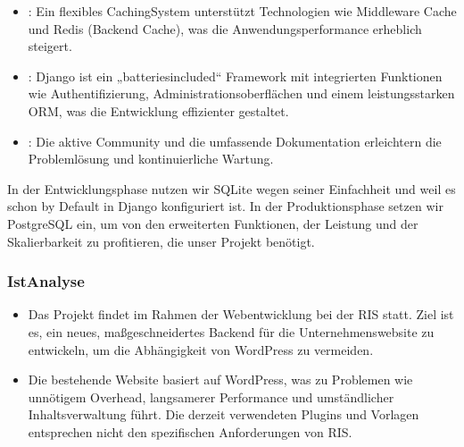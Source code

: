 \documentclass[a4paper,12pt,ngerman]{sphinxmanual}
\begin{document}
\sphinxAtStartPar
{}
\begin{itemize}
\item {} 
\sphinxAtStartPar
{}: Ein flexibles Caching\sphinxhyphen{}System unterstützt Technologien wie Middleware Cache und Redis (Backend Cache), was die Anwendungsperformance erheblich steigert.

\item {} 
\sphinxAtStartPar
{}: Django ist ein „batteries\sphinxhyphen{}included“ Framework mit integrierten Funktionen wie Authentifizierung, Administrationsoberflächen und einem leistungsstarken ORM, was die Entwicklung effizienter gestaltet.

\item {} 
\sphinxAtStartPar
{}: Die aktive Community und die umfassende Dokumentation erleichtern die Problemlösung und kontinuierliche Wartung.

\end{itemize}

\sphinxAtStartPar
In der Entwicklungsphase nutzen wir SQLite wegen seiner Einfachheit und weil es schon by Default in Django konfiguriert ist. In der Produktionsphase setzen wir PostgreSQL ein, um von den erweiterten Funktionen, der Leistung und der Skalierbarkeit zu profitieren, die unser Projekt benötigt.


\subsubsection{Ist\sphinxhyphen{}Analyse}
\label{\detokenize{sections/projektplanung_analyse:ist-analyse}}\begin{itemize}
\item {} 
\sphinxAtStartPar
Das Projekt findet im Rahmen der Webentwicklung bei der RIS statt. Ziel ist es, ein neues, maßgeschneidertes Backend für die Unternehmenswebsite zu entwickeln, um die Abhängigkeit von WordPress zu vermeiden.

\item {} 
\sphinxAtStartPar
Die bestehende Website basiert auf WordPress, was zu Problemen wie unnötigem Overhead, langsamerer Performance und umständlicher Inhaltsverwaltung führt. Die derzeit verwendeten Plugins und Vorlagen entsprechen nicht den spezifischen Anforderungen von RIS.

\end{itemize}
\end{document}
